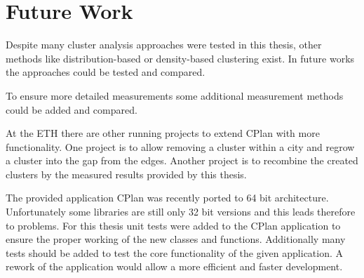 \chapter{Future Work}
\label{sec:future_work}

Despite many cluster analysis approaches were tested in this thesis, other methods like distribution-based or density-based clustering exist. In future works the approaches could be tested and compared. %

To ensure more detailed measurements some additional measurement methods could be added and compared.

At the ETH there are other running projects to extend CPlan with more functionality. One project is to allow removing a cluster within a city and regrow a cluster into the gap from the edges. Another project is to recombine the created clusters by the measured results provided by this thesis.

The provided application CPlan was recently ported to 64 bit architecture. Unfortunately some libraries are still only 32 bit versions and this leads therefore to problems. For this thesis unit tests were added to the CPlan application to ensure the proper working of the new classes and functions. Additionally many tests should be added to test the core functionality of the given application. A rework of the application would allow a more efficient and faster development.